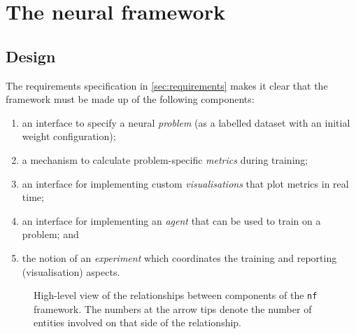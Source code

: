 \chapter{The neural framework}
\label{chap:framework}

\section{Design}
\label{sec:neural_framework_design}
The requirements specification in \ref{sec:requirements} makes it clear that the framework must be made up of the following components:
\begin{enumerate}
    \item an interface to specify a neural \textit{problem} (as a labelled dataset with an initial weight configuration);
    \item a mechanism to calculate problem-specific \textit{metrics} during training;
    \item an interface for implementing custom \textit{visualisations} that plot metrics in real time;
    \item an interface for implementing an \textit{agent} that can be used to train on a problem; and
    \item the notion of an \textit{experiment} which coordinates the training and reporting (visualisation) aspects.
\end{enumerate}
\begin{figure}
    \centering
    \caption{High-level view of the relationships between components of the \texttt{nf} framework. The numbers at the arrow tips denote the number of entities involved on that side of the relationship.}
    \label{fig:nf_components}
\end{figure}
